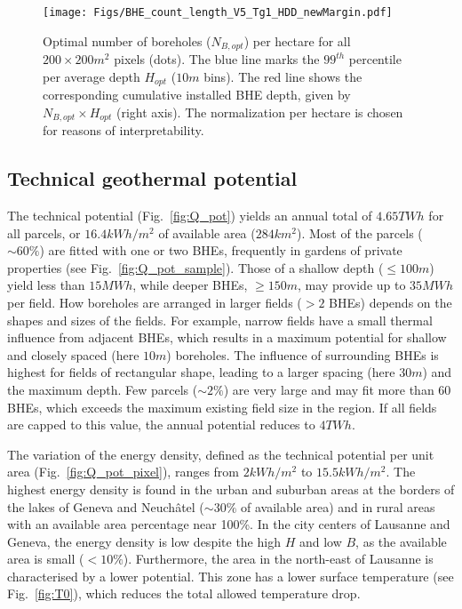 \begin{figure}[tb]
\centering
\texttt{[image: Figs/BHE\_count\_length\_V5\_Tg1\_HDD\_newMargin.pdf]} 
\caption{Optimal number of boreholes ($N_{B,opt}$) per hectare for all $200 \times 200m^2$ pixels (dots). The blue line marks the $99^{th}$ percentile per average depth $H_{opt}$ ($10m$ bins). The red line shows the corresponding cumulative installed BHE depth, given by $N_{B,opt} \times H_{opt}$ (right axis). The normalization per hectare is chosen for reasons of interpretability.}
\label{fig:BHE_count_len}
\end{figure}


\subsection{Technical geothermal potential}

The technical potential (Fig.~\ref{fig:Q_pot}) yields an annual total of $4.65 TWh$ for all parcels, or $16.4 kWh/m^2$ of available area ($284 km^2$). 
Most of the parcels ($\sim 60 \%$) are fitted with one or two BHEs, frequently in gardens of private properties (see Fig.~\ref{fig:Q_pot_sample}). 
%
Those of a shallow depth ($\leq 100m$) yield less than $15 MWh$, while deeper BHEs, $\geq 150m$, may provide up to $35 MWh$ per field. 
How boreholes are arranged in larger fields ($> 2$ BHEs) depends on the shapes and sizes of the fields. 
For example, narrow fields have a small thermal influence from adjacent BHEs, which results in a maximum potential for shallow and closely spaced (here $10m$) boreholes.
The influence of surrounding BHEs is highest for fields of rectangular shape, leading to a larger spacing (here $30m$) and the maximum depth. 
Few parcels ($\sim 2 \%$) are very large and may fit more than 60 BHEs, which exceeds the maximum existing field size in the region. If all fields are capped to this value, the annual potential reduces to $4 TWh$.

The variation of the energy density, defined as the technical potential per unit area (Fig.~\ref{fig:Q_pot_pixel}), ranges from $2 kWh/m^2$ to $15.5 kWh/m^2$. 
The highest energy density is found in the urban and suburban areas at the borders of the lakes of Geneva and Neuchâtel ($\sim 30 \%$ of available area) and in rural areas with an available area percentage near 100\%. 
In the city centers of Lausanne and Geneva, the energy density is low despite the high $H$ and low $B$, as the available area is small ($< 10\%$).
Furthermore, the area in the north-east of Lausanne is characterised by a lower potential. This zone has a lower surface temperature (see Fig.~\ref{fig:T0}), which reduces the total allowed temperature drop. 

